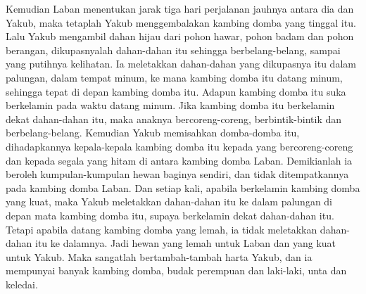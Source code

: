 \begin{biblechapter}
\verse Kemudian Laban menentukan jarak tiga hari perjalanan jauhnya antara dia dan Yakub, maka tetaplah Yakub menggembalakan kambing domba yang tinggal itu.
\verse Lalu Yakub mengambil dahan hijau dari pohon hawar, pohon badam dan pohon berangan, dikupasnyalah dahan-dahan itu sehingga berbelang-belang, sampai yang putihnya kelihatan.
\verse Ia meletakkan dahan-dahan yang dikupasnya itu dalam palungan, dalam tempat minum, ke mana kambing domba itu datang minum, sehingga tepat di depan kambing domba itu. Adapun kambing domba itu suka berkelamin pada waktu datang minum.
\verse Jika kambing domba itu berkelamin dekat dahan-dahan itu, maka anaknya bercoreng-coreng, berbintik-bintik dan berbelang-belang.
\verse Kemudian Yakub memisahkan domba-domba itu, dihadapkannya kepala-kepala kambing domba itu kepada yang bercoreng-coreng dan kepada segala yang hitam di antara kambing domba Laban. Demikianlah ia beroleh kumpulan-kumpulan hewan baginya sendiri, dan tidak ditempatkannya pada kambing domba Laban.
\verse Dan setiap kali, apabila berkelamin kambing domba yang kuat, maka Yakub meletakkan dahan-dahan itu ke dalam palungan di depan mata kambing domba itu, supaya berkelamin dekat dahan-dahan itu.
\verse Tetapi apabila datang kambing domba yang lemah, ia tidak meletakkan dahan-dahan itu ke dalamnya. Jadi hewan yang lemah untuk Laban dan yang kuat untuk Yakub.
\verse Maka sangatlah bertambah-tambah harta Yakub, dan ia mempunyai banyak kambing domba, budak perempuan dan laki-laki, unta dan keledai.
\end{biblechapter}

